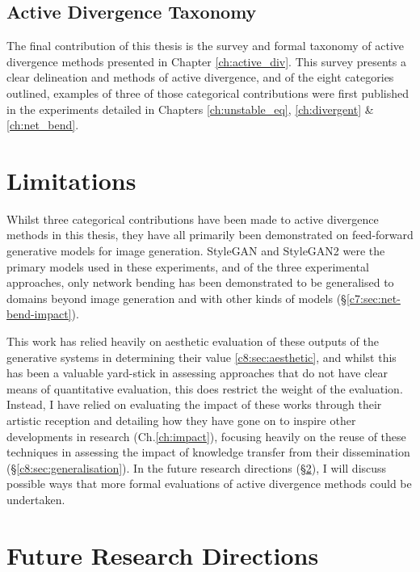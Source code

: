 \subsection{Active Divergence Taxonomy}

The final contribution of this thesis is the survey and formal taxonomy of active divergence methods presented in Chapter \ref{ch:active_div}.
This survey presents a clear delineation and methods of active divergence, and of the eight categories outlined, examples of three of those categorical contributions were first published in the experiments detailed in Chapters \ref{ch:unstable_eq}, \ref{ch:divergent}  \& \ref{ch:net_bend}.

\section{Limitations}
\label{c9:sec:limitations}

Whilst three categorical contributions have been made to active divergence methods in this thesis, they have all primarily been demonstrated on feed-forward generative models for image generation.
StyleGAN \citep{karras2019style} and StyleGAN2 \citep{karras2019analyzing} were the primary models used in these experiments, and of the three experimental approaches, only network bending has been demonstrated to be generalised to domains beyond image generation and with other kinds of models (\S \ref{c7:sec:net-bend-impact}).

This work has relied heavily on aesthetic evaluation of these outputs of the generative systems in determining their value \ref{c8:sec:aesthetic}, and whilst this has been a valuable yard-stick in assessing approaches that do not have clear means of quantitative evaluation, this does restrict the weight of the evaluation.
Instead, I have relied on evaluating the impact of these works through their artistic reception and detailing how they have gone on to inspire other developments in research (Ch.\ref{ch:impact}), focusing heavily on the reuse of these techniques in assessing the impact of knowledge transfer from their dissemination (\S \ref{c8:sec:generalisation}).
In the future research directions (\S \ref{c9:sec:future}), I will discuss possible ways that more formal evaluations of active divergence methods could be undertaken.

\section{Future Research Directions}
\label{c9:sec:future}

